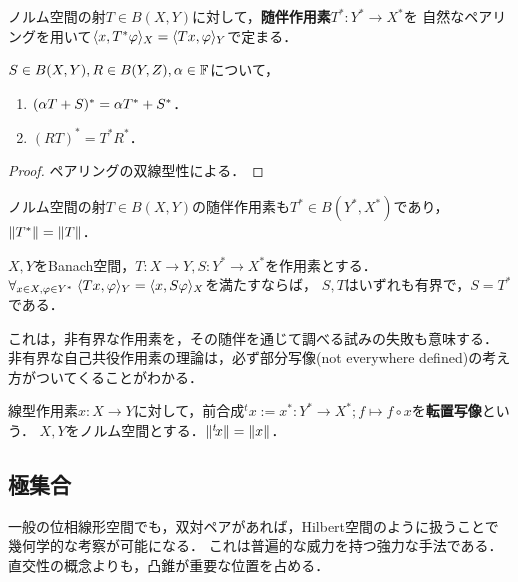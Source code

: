 \documentclass[uplatex,dvipdfmx]{jsreport}
\begin{document}
\begin{definition}
    ノルム空間の射$T\in B(X,Y)$に対して，\textbf{随伴作用素}$T^*:Y^*\to X^*$を
    自然なペアリングを用いて$\langle x,T^*\varphi\rangle_X=\langle Tx,\varphi\rangle_Y$で定まる．
\end{definition}

\begin{lemma}[$*$-作用素の反変関手性]
    $S\in B(X,Y),R\in B(Y,Z),\alpha\in\mathbb{F}$について，
    \begin{enumerate}
        \item $(\alpha T+S)^*=\alpha T^*+S^*$．
        \item $(RT)^*=T^*R^*$．
    \end{enumerate}
\end{lemma}
\begin{proof}
    ペアリングの双線型性による．
\end{proof}

\begin{proposition}[$*$-作用素の等長性]
    ノルム空間の射$T\in B(X,Y)$の随伴作用素も$T^*\in B(Y^*,X^*)$であり，$\|T^*\|=\|T\|$．
\end{proposition}

\begin{proposition}[随伴であるための必要条件]
    $X,Y$をBanach空間，$T:X\to Y,S:Y^*\to X^*$を作用素とする．
    $\forall_{x\in X,\varphi\in Y^*}\;\langle Tx,\varphi\rangle_Y=\langle x,S\varphi\rangle_X$を満たすならば，
    $S,T$はいずれも有界で，$S=T^*$である．
\end{proposition}
\begin{remarks}[随伴ならば有界]
    これは，非有界な作用素を，その随伴を通じて調べる試みの失敗も意味する．
    非有界な自己共役作用素の理論は，必ず部分写像(not everywhere defined)の考え方がついてくることがわかる．
\end{remarks}

\begin{example}[transpose]
    線型作用素$x:X\to Y$に対して，前合成${}^t\!x:=x^*:Y^*\to X^*;f\mapsto f\circ x$を\textbf{転置写像}という．
    $X,Y$をノルム空間とする．$\|{}^t\!x\|=\|x\|$．
\end{example}

\subsection{極集合}

\begin{tcolorbox}[colframe=ForestGreen, colback=ForestGreen!10!white,breakable,colbacktitle=ForestGreen!40!white,coltitle=black,fonttitle=\bfseries\sffamily,
title=]
    一般の位相線形空間でも，双対ペアがあれば，Hilbert空間のように扱うことで幾何学的な考察が可能になる．
    これは普遍的な威力を持つ強力な手法である．
    直交性の概念よりも，凸錐が重要な位置を占める．
\end{tcolorbox}
\end{document}
